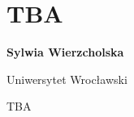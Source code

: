 \documentclass[\main/boa.tex]{subfiles}
\begin{document}
\section{TBA}

\begin{minipage}{0.915\textwidth}
	\centering
  {\bf {}  Sylwia Wierzcholska}
\end{minipage}

\vskip 0.3cm

\begin{affiliations}
\begin{minipage}{0.915\textwidth}
\centering
Uniwersytet Wrocławski  \\[-2pt]
\end{minipage}
\end{affiliations}

\vskip 0.8cm

TBA
\end{document}
